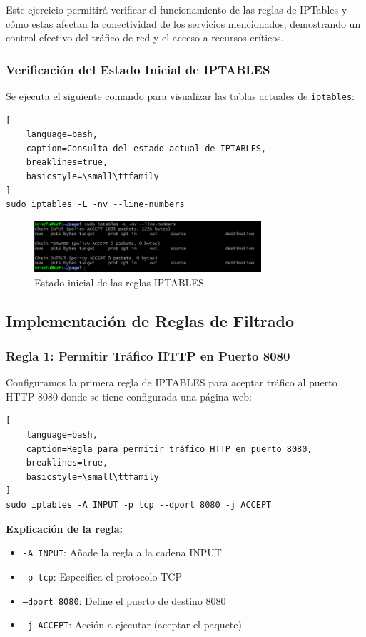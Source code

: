 \documentclass[12pt,a4paper]{article}
\begin{document}
Este ejercicio permitirá verificar el funcionamiento de las reglas de IPTables
y cómo estas afectan la conectividad de los servicios mencionados, demostrando
un control efectivo del tráfico de red y el acceso a recursos críticos.

\subsubsection{Verificación del Estado Inicial de IPTABLES}

Se ejecuta el siguiente comando para visualizar las tablas actuales de
\texttt{iptables}:

\begin{lstlisting}[
    language=bash, 
    caption=Consulta del estado actual de IPTABLES,
    breaklines=true,
    basicstyle=\small\ttfamily
]
sudo iptables -L -nv --line-numbers
\end{lstlisting}

\begin{figure}[H]
  \centering
  \includegraphics[width=0.75\textwidth]{./assets/img7.png}
  \caption{Estado inicial de las reglas IPTABLES}
  \label{fig:iptables-inicial}
\end{figure}

\subsection{Implementación de Reglas de Filtrado}

\subsubsection{Regla 1: Permitir Tráfico HTTP en Puerto 8080}

Configuramos la primera regla de IPTABLES para aceptar tráfico al puerto HTTP
8080 donde se tiene configurada una página web:

\begin{lstlisting}[
    language=bash, 
    caption=Regla para permitir tráfico HTTP en puerto 8080,
    breaklines=true,
    basicstyle=\small\ttfamily
]
sudo iptables -A INPUT -p tcp --dport 8080 -j ACCEPT
\end{lstlisting}

\textbf{Explicación de la regla:}
\begin{itemize}
  \item \texttt{-A INPUT}: Añade la regla a la cadena INPUT
  \item \texttt{-p tcp}: Especifica el protocolo TCP
  \item \texttt{--dport 8080}: Define el puerto de destino 8080
  \item \texttt{-j ACCEPT}: Acción a ejecutar (aceptar el paquete)
\end{itemize}
\end{document}

